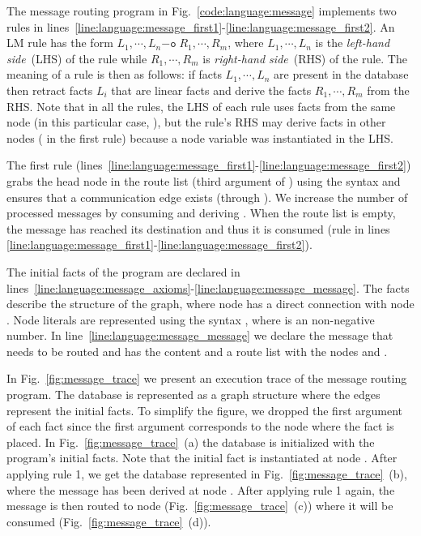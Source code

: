 The message routing program in Fig.~\ref{code:language:message} implements two
rules in
lines~\ref{line:language:message_first1}-\ref{line:language:message_first2}. An
LM rule has the form $L_1, \cdots, L_n \mathtt{-o} \; R_1, \cdots, R_m$, where
$L_1, \cdots, L_n$ is the \emph{left-hand side}~(LHS) of the rule while $R_1,
\cdots, R_m$ is \emph{right-hand side}~(RHS) of the rule. The meaning of a rule
is then as follows: if facts $L_1, \cdots, L_n$ are present in the database then
retract facts $L_i$ that are linear facts and derive the facts $R_1, \cdots,
R_m$ from the RHS. Note that in all the rules, the LHS of each rule uses facts
from the same node (in this particular case, ), but the rule's RHS may
derive facts in other nodes ( in the first rule) because a node variable
was instantiated in the LHS.

The first rule
(lines~\ref{line:language:message_first1}-\ref{line:language:message_first2})
grabs the head node in the route list (third argument of ) using
the syntax \code{[B | L]} and ensures that a communication edge exists (through
). We increase the number of processed messages by consuming
 and deriving .  When the route
list is empty, the message has reached its destination and thus it is consumed
(rule in lines
\ref{line:language:message_first1}-\ref{line:language:message_first2}).

The initial facts of the program are declared in
lines~\ref{line:language:message_axioms}-\ref{line:language:message_message}.
The  facts describe the structure of the graph, where node
 has a direct connection with node . Node literals are
represented using the syntax , where  is an non-negative
number. In line~\ref{line:language:message_message} we declare the message that
needs to be routed and has the content  and a route list
with the nodes  and .

In Fig.~\ref{fig:message_trace} we present an execution trace of the message
routing program. The database is represented as a graph structure where the
edges represent the  initial facts. To simplify the figure, we
dropped the first argument of each fact since the first argument corresponds to
the node where the fact is placed. In Fig.~\ref{fig:message_trace}~(a) the
database is initialized with the program's initial facts. Note that the initial
 fact is instantiated at node . After applying rule 1, we
get the database represented in Fig.~\ref{fig:message_trace}~(b), where the
message has been derived at node . After applying rule 1 again, the
message is then routed to node  (Fig.~\ref{fig:message_trace}~(c))
where it will be consumed (Fig.~\ref{fig:message_trace}~(d)).

